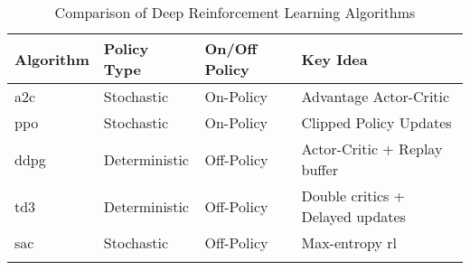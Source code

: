 \begin{longtable}{|l|l|l|l|}
    \hline
    \textbf{Algorithm} & \textbf{Policy Type} & \textbf{On/Off Policy} & \textbf{Key Idea} \\
    \hline
    \endhead
    \acrshort{a2c} & Stochastic & On-Policy & Advantage Actor-Critic \\ \hline
    \acrshort{ppo} & Stochastic & On-Policy & Clipped Policy Updates \\ \hline
    \acrshort{ddpg} & Deterministic & Off-Policy & Actor-Critic + Replay buffer \\ \hline
    \acrshort{td3} & Deterministic & Off-Policy & Double critics + Delayed updates \\ \hline
    \acrshort{sac} & Stochastic & Off-Policy & Max-entropy \acrshort{rl} \\ \hline
\caption{Comparison of Deep Reinforcement Learning Algorithms}
\label{tab:drl_algorithms_comparison}
\end{longtable}